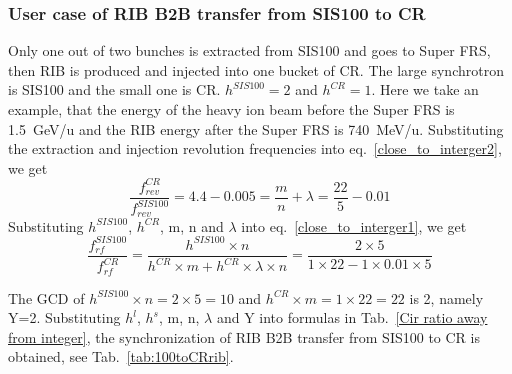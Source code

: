 \subsubsection{User case of RIB B2B transfer from SIS100 to CR} 
Only one out of two bunches is extracted from SIS100 and goes to Super FRS, then RIB is produced and injected into one bucket of CR. The large synchrotron is SIS100 and the small one is CR. $h^{SIS100}=2$ and $h^{CR}=1$. Here we take an example, that the energy of the heavy ion beam before the Super FRS is \SI{1.5}{GeV/\atomicmassunit} and the RIB energy after the Super FRS is \SI{740}{MeV/\atomicmassunit}. Substituting the extraction and injection revolution frequencies into eq.~\ref{close_to_interger2}, we get
\begin{equation} 
\frac{f_{rev}^{CR}}{f_{rev}^{SIS100}}=4.4-0.005=\frac{m}{n}+ \lambda=\frac{22}{5}-0.01
\end{equation}
Substituting $h^{SIS100}$, $h^{CR}$, m, n and $\lambda$ into eq.~\ref{close_to_interger1}, we get
\begin{equation} 
\frac{f_{rf}^{SIS100}}{f_{rf}^{CR}}=\frac{h^{SIS100}\times n}{h^{CR} \times m+ h^{CR} \times\lambda\times n}=\frac{2\times 5}{1 \times 22- 1 \times0.01\times 5}
\end{equation}

The GCD of $h^{SIS100}\times n=2\times5=10$ and $h^{CR} \times m=1\times 22=22$ is 2, namely Y=2. Substituting $h^l$, $h^s$, m, n, $\lambda$ and Y into formulas in Tab.~\ref{Cir ratio away from integer}, the synchronization of RIB B2B transfer from SIS100 to CR is obtained, see Tab.~\ref{tab:100toCRrib}.

